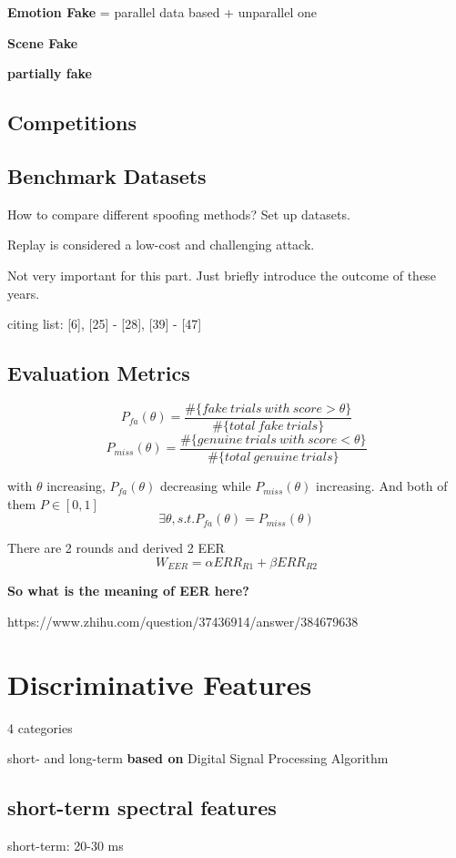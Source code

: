 \documentclass{article}
\begin{document}
\textbf{Emotion Fake} = parallel data based + unparallel one

\textbf{Scene Fake}

\textbf{partially fake}

\subsection{Competitions}

\subsection{Benchmark Datasets}
\noindent
How to compare different spoofing methods? Set up datasets. 

Replay is considered a low-cost and challenging attack. 

Not very important for this part. Just briefly introduce the outcome of these years. 

citing list: [6], [25] - [28], [39] - [47]

\subsection{Evaluation Metrics}
\[
P_{fa}(\theta)=\frac{\#\{fake \ trials \ with \ score > \theta\}}{\#\{total\ fake\ trials\}}
\]
\[
P_{miss}(\theta) = \frac{\#\{genuine\ trials\ with\ score < \theta\}}{\#\{total\ genuine\ trials\}}
\]

with $\theta$ increasing, $P_{fa}(\theta)$ decreasing while $P_{miss}(\theta)$ increasing. And both of them $P \in [0, 1]$
\[
\exists \theta, s.t. P_{fa}(\theta) = P_{miss}(\theta)
\]

There are 2 rounds and derived 2 EER
\[
W_{EER} = \alpha ERR_{R1} + \beta ERR_{R2}
\]


\textbf{So what is the meaning of EER here?}

https://www.zhihu.com/question/37436914/answer/384679638

\section{Discriminative Features}
4 categories

short- and long-term \textbf{based on} Digital Signal Processing Algorithm

\subsection{short-term spectral features}
short-term: 20-30 ms
\end{document}
